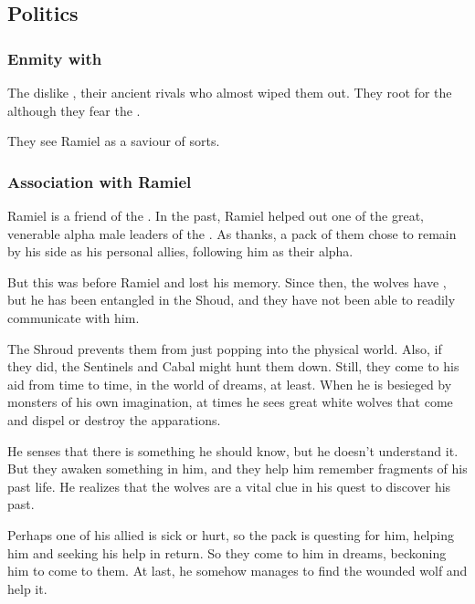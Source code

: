 \subsection{Politics}
\subsubsection{Enmity with \dragons}
The \moonwolves{} dislike \dragons, their ancient rivals who almost wiped them out. They root for the \resphain\dash although they fear the \banes. 

They see Ramiel as a saviour of sorts.





\subsubsection{Association with Ramiel}
Ramiel is a friend of the \MoonWolves{}. In the past, Ramiel helped out one of the great, venerable alpha male leaders of the \moonwolves. As thanks, a pack of them chose to remain by his side as his personal allies, following him as their alpha.

But this was before Ramiel  and lost his memory. Since then, the wolves have , but he has been entangled in the Shoud, and they have not been able to readily communicate with him. 

The Shroud prevents them from just popping into the physical world. Also, if they did, the Sentinels and Cabal might hunt them down. Still, they come to his aid from time to time, in the world of dreams, at least. When he is besieged by monsters of his own imagination, at times he sees great white wolves that come and dispel or destroy the apparations. 

He senses that there is something he should know, but he doesn't understand it. But they awaken something in him, and they help him remember fragments of his past life. He realizes that the wolves are a vital clue in his quest to discover his past.

Perhaps one of his allied \moonwolves{} is sick or hurt, so the pack is questing for him, helping him and seeking his help in return. So they come to him in dreams, beckoning him to come to them. At last, he somehow manages to find the wounded wolf and help it. 

